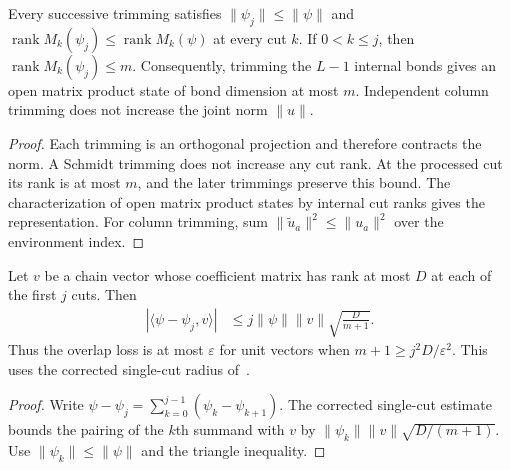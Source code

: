 \begin{lemma}
    \label{lem:lvv_successive_trimming_rank}
    \leanok
    Every successive trimming satisfies $\|\psi_j\|\le\|\psi\|$ and
    $\operatorname{rank}M_k(\psi_j)\le\operatorname{rank}M_k(\psi)$ at
    every cut $k$. If $0<k\le j$, then
    $\operatorname{rank}M_k(\psi_j)\le m$. Consequently, trimming the
    $L-1$ internal bonds gives an open matrix product state of bond
    dimension at most $m$. Independent column trimming does not increase
    the joint norm $\|u\|$.
\end{lemma}
\begin{proof}
    \leanok
    Each trimming is an orthogonal projection and therefore contracts
    the norm. A Schmidt trimming does not increase any cut rank. At the
    processed cut its rank is at most $m$, and the later trimmings preserve
    this bound. The characterization of open matrix product states by
    internal cut ranks gives the representation. For column trimming,
    sum $\|\widetilde u_a\|^2\le\|u_a\|^2$ over the environment index.
\end{proof}

\begin{lemma}
    \label{lem:lvv_successive_trimming_overlap}
    \leanok
    Let $v$ be a chain vector whose coefficient matrix has rank at most
    $D$ at each of the first $j$ cuts. Then
    \begin{align}
        |\langle\psi-\psi_j,v\rangle|
         & \le j\|\psi\|\|v\|\sqrt{\frac{D}{m+1}}.
    \end{align}
    Thus the overlap loss is at most $\varepsilon$ for unit vectors when
    $m+1\ge j^2D/\varepsilon^2$. This uses the corrected single-cut
    radius of~\cite{gap:lvv13_trimming_radius}.
\end{lemma}
\begin{proof}
    \leanok
    Write $\psi-\psi_j=\sum_{k=0}^{j-1}(\psi_k-\psi_{k+1})$.
    The corrected single-cut estimate bounds the pairing of the $k$th
    summand with $v$ by $\|\psi_k\|\|v\|\sqrt{D/(m+1)}$.
    Use $\|\psi_k\|\le\|\psi\|$ and the triangle inequality.
\end{proof}

